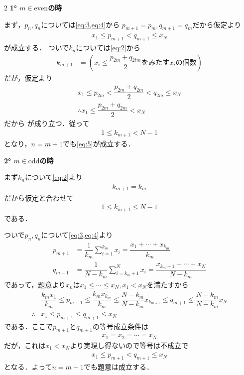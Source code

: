 \documentclass[../../main.tex]{subfiles}
\begin{document}
\begin{multicols}{2}
  \textbf{1° $m\in \text{even}$の時}

  まず，$p_n,q_n$については\cref{eq:3,eq:4}から
  $p_{m+1} = p_m, q_{m+1} = q_m$だから仮定より
  \begin{align}
    x_1 \le p_{m+1} < q_{m+1} \le x_N
  \end{align}
  が成立する．
  ついで$k_n$については\cref{eq:2}から
  \begin{align}
    k_{m+1}
    & = \left( x_i \le \dfrac{p_{2m}+q_{2tm}}{2} \text{をみたす} x_i \text{の個数} \right)
  \end{align}
  だが，仮定より
  \begin{align}
    x_1 \le p_{2m} < \dfrac{p_{2m}+q_{2m}}{2} < q_{2m} \le x_N \\
    \therefore
    x_1 \le \dfrac{p_{2m}+q_{2m}}{2} < x_{N}
  \end{align}
  だから
  が成り立つ．従って
  \begin{align}
    1 \le k_{m+1} < N-1
  \end{align}
  となり，$n=m+1$でも\cref{eq:5}が成立する．

  \textbf{2° $m\in \text{odd}$の時}

  まず$k_n$について\cref{eq:2}より
  \begin{align}
    k_{m+1} = k_{m}
  \end{align}
  だから仮定と合わせて
  \begin{align}
    1 \le k_{m+1} \le N-1
  \end{align}
  である．

  ついで$p_n,q_n$について\cref{eq:3,eq:4}より
  \begin{align}
    p_{m+1} & = \dfrac{1}{k_m}\sum_{i=1}^{k_m}x_i = \dfrac{x_1+\cdots+x_{k_m}}{k_m}         \\
    q_{m+1} & = \dfrac{1}{N-k_m}\sum_{i=k_m+1}^{N}x_i = \dfrac{x_{k_m+1}+\cdots+x_N}{N-k_m}
  \end{align}
  であって，題意より$x_n$は$x_1 \le \cdots \le x_N, x_1 < x_N$を満たすから
  \begin{align}
    & \dfrac{k_m x_1}{k_m} \le p_{m+1} \le \dfrac{k_m x_{k_m}}{k_m}
    \le \dfrac{N-k_m}{N-k_m}x_{k_{m+1}} \le q_{m+1} \le \dfrac{N-k_m}{N-k_m}x_N \\
    \therefore
    & x_1 \le p_{m+1} \le q_{m+1} \le x_N
  \end{align}
  である．ここで$p_{m+1}$と$q_{m+1}$の等号成立条件は
  \begin{align}
    x_{1} = x_{2} = \cdots = x_{N}
  \end{align}
  だが，これは$x_1 < x_N$より実現し得ないので等号は不成立で
  \begin{align}
    x_1 \le p_{m+1} < q_{m+1} \le x_N
  \end{align}
  となる．よって$n=m+1$でも題意は成立する．


\end{multicols}
\end{document}
